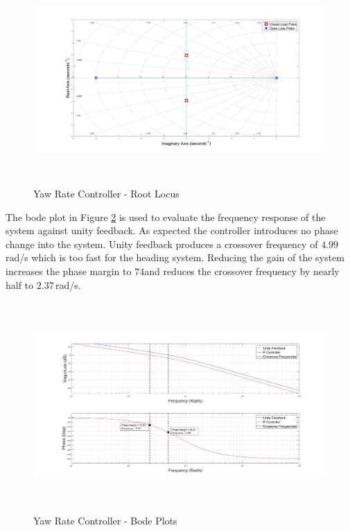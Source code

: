 	\begin{figure}[H]
		\centering
		\includegraphics[height = 8cm]{../Design/Matlab/Controllers/yaw_rate_root.jpg}
		\caption{Yaw Rate Controller -  Root Locus}
		\label{IM_YawRateControlRoot}
	\end{figure}
	
	The bode plot in Figure \ref{IM_YawRateControlBode} is used to evaluate the frequency response of the system against unity feedback. As expected the controller introduces no phase change into the system. Unity feedback produces a crossover frequency of $4.99$\,rad/s which is too fast for the heading system. Reducing the gain of the system increases the phase margin to $74$\textdegree and reduces the crossover frequency by nearly half to $2.37$\,rad/s.
	
	\begin{figure}[H]
		\centering
		\includegraphics[height = 8cm]{../Design/Matlab/Controllers/yaw_rate_bode.jpg}
		\caption{Yaw Rate Controller -  Bode Plots}
		\label{IM_YawRateControlBode}
	\end{figure}
	
